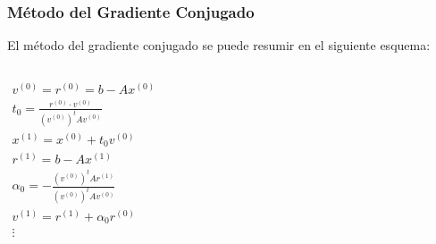 \documentclass[10pt]{beamer}
\begin{document}
\begin{frame}
  \frametitle{M\'etodo del Gradiente Conjugado}
  El m\'etodo del gradiente conjugado se puede resumir en el siguiente esquema:\\[10pt]
  \small
  \begin{columns}
    $$
    \begin{array}{l}
    v^{(0)} = r^{(0)} = b - Ax^{(0)}\\[5pt]
    t_0 = \displaystyle\frac{r^{(0)}\cdot v^{(0)}}{(v^{(0)})^tAv^{(0)}}\\[10pt]
    x^{(1)} = x^{(0)} + t_0v^{(0)}\\[5pt]
    r^{(1)} = b -Ax^{(1)}\\[5pt]
    \alpha_0 = -\displaystyle\frac{(v^{(0)})^tAr^{(1)}}{(v^{(0)})^tAv^{(0)}}\\[10pt]
    v^{(1)}=r^{(1)}+\alpha_0r^{(0)}\\[5pt]
    \vdots
    \end{array}
    $$
  \end{columns}
\end{frame}
\end{document}
